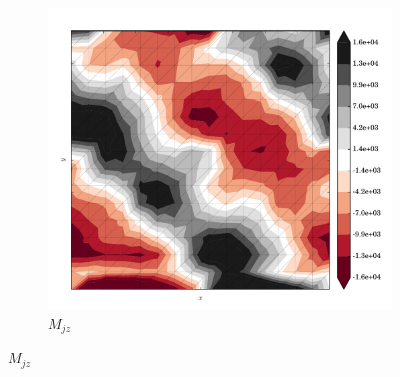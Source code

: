 \begin{figure}
  \begin{subfigure}[b]{0.3\linewidth}
    \includegraphics[width=\linewidth]{images/stress_balance/RS/M_jz.pdf}
  \caption{$M_{jz}$}
  \label{rs_M_jz}
  \end{subfigure}


\end{figure}
